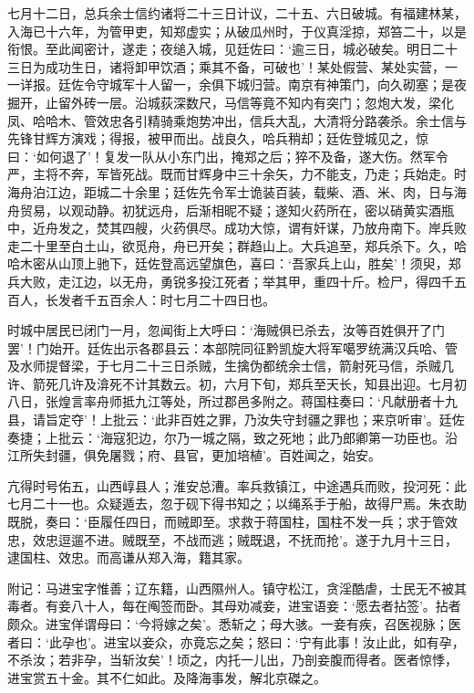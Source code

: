 \documentclass[]{article}
\begin{document}
七月十二日，总兵余士信约诸将二十三日计议，二十五、六日破城。有福建林某，入海已十六年，为管甲吏，知郑虚实；从破瓜州时，于仪真淫掠，郑笞二十，以是衔恨。至此闻密计，遂走；夜缒入城，见廷佐曰：`逾三日，城必破矣。明日二十三日为成功生日，诸将卸甲饮酒；乘其不备，可破也'！某处假营、某处实营，一一详报。廷佐令守城军十人留一，余俱下城归营。南京有神策门，向久砌塞；是夜掘开，止留外砖一层。沿城荻深数尺，马信等竟不知内有突门；忽炮大发，梁化凤、哈哈木、管效忠各引精骑乘炮势冲出，信兵大乱，大清将分路袭杀。余士信与先锋甘辉方演戏；得报，被甲而出。战良久，哈兵稍却；廷佐登城见之，惊曰：`如何退了'！复发一队从小东门出，掩郑之后；猝不及备，遂大伤。然军令严，主将不奔，军皆死战。既而甘辉身中三十余矢，力不能支，乃走；兵始走。时海舟泊江边，距城二十余里；廷佐先令军士诡装百装，载柴、酒、米、肉，日与海舟贸易，以观动静。初犹远舟，后渐相昵不疑；遂知火药所在，密以硝黄实酒瓶中，近舟发之，焚其四艘，火药俱尽。成功大惊，谓有奸谋，乃放舟南下。岸兵败走二十里至白土山，欲觅舟，舟已开矣；群趋山上。大兵追至，郑兵杀下。久，哈哈木密从山顶上驰下，廷佐登高远望旗色，喜曰：`吾家兵上山，胜矣'！须臾，郑兵大败，走江边，以无舟，勇锐多投江死者；举其甲，重四十斤。检尸，得四千五百人，长发者千五百余人：时七月二十四日也。

时城中居民已闭门一月，忽闻街上大呼曰：`海贼俱已杀去，汝等百姓俱开了门罢'！门始开。廷佐出示各郡县云：本部院同征黔凯旋大将军噶罗统满汉兵哈、管及水师提督梁，于七月二十三日杀贼，生擒伪都统余士信，箭射死马信，杀贼几许、箭死几许及渰死不计其数云。初，六月下旬，郑兵至天长，知县出迎。七月初八日，张煌言率舟师抵九江等处，所过郡邑多附之。蒋国柱奏曰：`凡献册者十九县，请旨定夺'！上批云：`此非百姓之罪，乃汝失守封疆之罪也；来京听审'。廷佐奏捷；上批云：`海寇犯边，尔乃一城之隔，致之死地；此乃郎卿第一功臣也。沿江所失封疆，俱免屠戮；府、县官，更加培植'。百姓闻之，始安。

亢得时号佑五，山西崞县人；淮安总漕。率兵救镇江，中途遇兵而败，投河死：此七月二十一也。众疑遁去，忽于砚下得书知之；以绳系手于船，故得尸焉。朱衣助既脱，奏曰：`臣履任四日，而贼即至。求救于蒋国柱，国柱不发一兵；求于管效忠，效忠逗遛不进。贼既至，不战而逃；贼既退，不抚而抢'。遂于九月十三日，逮国柱、效忠。而高谦从郑入海，籍其家。

附记：马进宝字惟善；辽东籍，山西隰州人。镇守松江，贪淫酷虐，士民无不被其毒者。有妾八十人，每在阄签而卧。其母劝减妾，进宝语妾：`愿去者拈签'。拈者颇众。进宝佯谓母曰：`今将嫁之矣'。悉斩之；母大骇。一妾有疾，召医视脉；医者曰：`此孕也'。进宝以妾众，亦竟忘之矣；怒曰：`宁有此事！汝止此，如有孕，不杀汝；若非孕，当斩汝矣'！顷之，内托一儿出，乃剖妾腹而得者。医者惊悸，进宝赏五十金。其不仁如此。及降海事发，解北京磔之。
\end{document}
